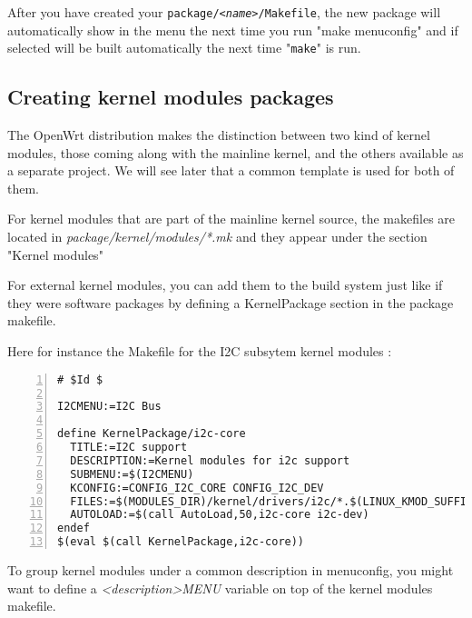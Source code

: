 After you have created your \texttt{package/\textit{<name>}/Makefile}, the new package
will automatically show in the menu the next time you run "make menuconfig" and if selected
will be built automatically the next time "\texttt{make}" is run.

\subsection{Creating kernel modules packages}

The OpenWrt distribution makes the distinction between two kind of kernel modules, those coming along with the mainline kernel, and the others available as a separate project. We will see later that a common template is used for both of them.

For kernel modules that are part of the mainline kernel source, the makefiles are located in \textit{package/kernel/modules/*.mk} and they appear under the section "Kernel modules"

For external kernel modules, you can add them to the build system just like if they were software packages by defining a KernelPackage section in the package makefile.

Here for instance the Makefile for the I2C subsytem kernel modules :

\begin{Verbatim}[frame=single,numbers=left]
# $Id $

I2CMENU:=I2C Bus

define KernelPackage/i2c-core
  TITLE:=I2C support
  DESCRIPTION:=Kernel modules for i2c support
  SUBMENU:=$(I2CMENU)
  KCONFIG:=CONFIG_I2C_CORE CONFIG_I2C_DEV
  FILES:=$(MODULES_DIR)/kernel/drivers/i2c/*.$(LINUX_KMOD_SUFFIX)
  AUTOLOAD:=$(call AutoLoad,50,i2c-core i2c-dev)
endef
$(eval $(call KernelPackage,i2c-core))
\end{Verbatim}

To group kernel modules under a common description in menuconfig, you might want to define a \textit{<description>MENU} variable on top of the kernel modules makefile.

